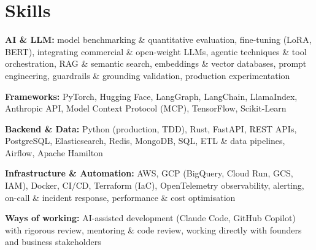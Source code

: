 \documentclass[10pt,a4paper]{article}
\begin{document}
\section{Skills}
\begin{tight}
  \item[\textcolor{accent}{\small$\bullet$}] \textbf{AI \& LLM:} model benchmarking \& quantitative evaluation, fine-tuning (LoRA, BERT), integrating commercial \& open-weight LLMs, agentic techniques \& tool orchestration, RAG \& semantic search, embeddings \& vector databases, prompt engineering, guardrails \& grounding validation, production experimentation
  \item[\textcolor{accent}{\small$\bullet$}] \textbf{Frameworks:} PyTorch, Hugging Face, LangGraph, LangChain, LlamaIndex, Anthropic API, Model Context Protocol (MCP), TensorFlow, Scikit-Learn
  \item[\textcolor{accent}{\small$\bullet$}] \textbf{Backend \& Data:} Python (production, TDD), Rust, FastAPI, REST APIs, PostgreSQL, Elasticsearch, Redis, MongoDB, SQL, ETL \& data pipelines, Airflow, Apache Hamilton
  \item[\textcolor{accent}{\small$\bullet$}] \textbf{Infrastructure \& Automation:} AWS, GCP (BigQuery, Cloud Run, GCS, IAM), Docker, CI/CD, Terraform (IaC), OpenTelemetry observability, alerting, on-call \& incident response, performance \& cost optimisation
  \item[\textcolor{accent}{\small$\bullet$}] \textbf{Ways of working:} AI-assisted development (Claude Code, GitHub Copilot) with rigorous review, mentoring \& code review, working directly with founders and business stakeholders
\end{tight}

\end{document}
